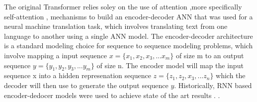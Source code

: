 The original Transformer relies soley on the use of attention \cite{bahdanau2014neural},more specifically self-attention , mechanisms to build an encoder-decoder ANN that was used for a neural machine translation task, which involves translating text from one language to another using a single ANN model. The encoder-decoder architecture is a standard modeling choice for sequence to sequence modeling problems, which involve mapping a input sequence $x = \{x_1, x_2, x_3,...x_m\}$ of size m to an output sequence $y = \{y_1, y_2, y_3, ... y_m\}$ of size n. The encoder model will map the input sequence x into a hidden represenation sequence $z = \{z_1, z_2, x_3, ... z_n\}$ which the decoder will then use to generate the output sequence $y$. Historically, RNN based encoder-dedocer models were used to achieve state of the art results . . 
